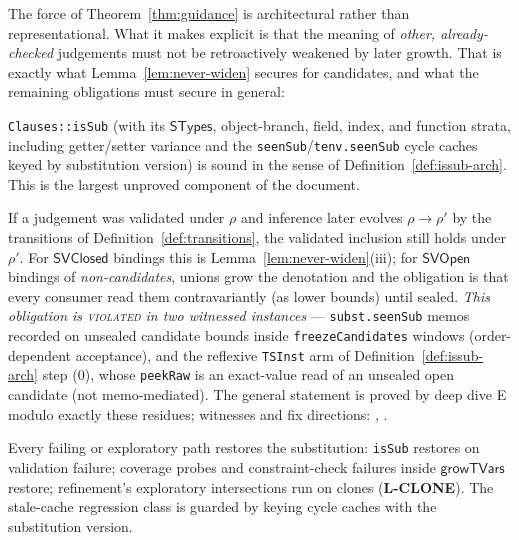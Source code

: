 \documentclass[11pt]{article}
\newcommand{\STypes}{\mathsf{STypes}}
\newcommand{\SVOpen}{\mathsf{SVOpen}}
\newcommand{\SVClosed}{\mathsf{SVClosed}}
\begin{document}
The force of Theorem~\ref{thm:guidance} is architectural rather than
representational. What it makes explicit is that the meaning of
\emph{other, already-checked} judgements must not be retroactively weakened
by later growth. That is exactly what
Lemma~\ref{lem:never-widen} secures for candidates, and what the remaining
obligations must secure in general:

\begin{obligation}
\label{obl:sub}
\texttt{Clauses::isSub} (with its $\STypes$, object-branch, field,
index, and function strata, including getter/setter variance and the
\texttt{seenSub}/\texttt{tenv.seenSub} cycle caches keyed by substitution
version) is sound in the sense of Definition~\ref{def:issub-arch}. This is
the largest unproved component of the document.
\end{obligation}

\begin{obligation}
\label{obl:monotone}
If a judgement was validated under $\rho$ and inference later evolves
$\rho \to \rho'$ by the transitions of Definition~\ref{def:transitions},
the validated inclusion still holds under $\rho'$. For $\SVClosed$ bindings
this is Lemma~\ref{lem:never-widen}(iii); for $\SVOpen$ bindings of
\emph{non-candidates}, unions grow the denotation and the obligation is that
every consumer read them contravariantly (as lower bounds) until sealed.
\emph{This obligation is \textsc{violated} in
two witnessed instances} — \texttt{subst.seenSub} memos recorded
on unsealed candidate bounds inside \texttt{freezeCandidates} windows
(order-dependent acceptance), and the reflexive \texttt{TSInst} arm of
Definition~\ref{def:issub-arch} step (0), whose \texttt{peekRaw} is an
exact-value read of an unsealed open candidate (not memo-mediated). The
general statement is proved by deep dive
E modulo exactly these residues; witnesses and fix directions:
,
.
\end{obligation}

\begin{obligation}
\label{obl:restore}
Every failing or exploratory path restores the substitution:
\texttt{isSub} restores on validation failure; coverage probes and
constraint-check failures inside $\mathsf{growTVars}$ restore; refinement's
exploratory intersections run on clones (\textbf{L-CLONE}). The stale-cache
regression class is guarded by keying cycle caches with the substitution
version.
\end{obligation}
\end{document}
